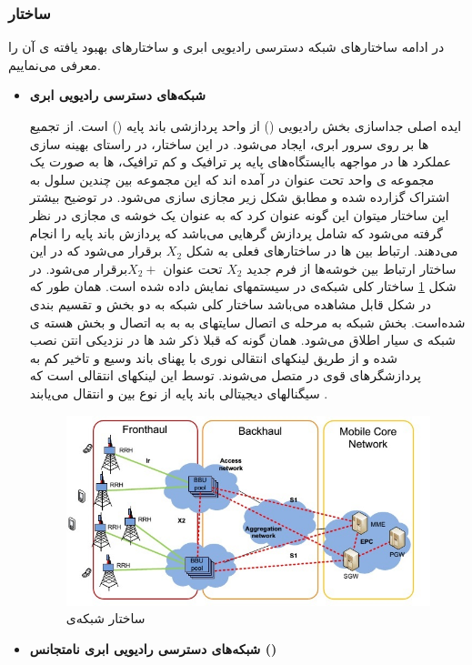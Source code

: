 \subsubsection{ساختار }
در ادامه ساختارهای شبکه دسترسی رادیویی ابری و ساختارهای بهبود یافته ی آن را معرفی می‌نماییم.
\begin{itemize}
\item \textbf{شبکه‌های دسترسی رادیویی ابری}


ایده اصلی  جداسازی بخش رادیویی () 
 از واحد پردازشی باند پایه ()
  است.
از تجمیع ها بر روی سرور ابری،  ایجاد می‌شود.
در این ساختار، در راستای بهینه سازی عملکرد 
ها در مواجهه باایستگاه‌های پایه پر ترافیک و کم ترافیک،
 ها به صورت یک مجموعه ی واحد تحت عنوان 
 در آمده اند که این مجموعه بین چندین سلول 
 به اشتراک گزارده شده و مطابق شکل زیر مجازی سازی
می‌شود. 
در توضیح بیشتر این ساختار میتوان این گونه
عنوان کرد که  به عنوان یک خوشه ی مجازی
در نظر گرفته می‌شود که شامل پردازش گرهایی می‌باشد
که پردازش‌‌ باند پایه را انجام می‌دهند. ارتباط بین
  ها در ساختارهای فعلی به شکل  $X_2$ برقرار می‌شود
که در این ساختار ارتباط بین خوشه‌ها از فرم جدید $X_2$
تحت عنوان  $X_2 +$برقرار می‌شود.
\newline
در شکل \ref{fig:C-RAN} ساختار کلی شبکه‌ی   در سیستمهای
 نمایش داده شده است. همان طور که در شکل قابل
مشاهده می‌باشد ساختار کلی شبکه   به دو بخش
  و  تقسیم بندی شده‌است. بخش
 شبکه به مرحله ی اتصال سایتهای به
 به  به اتصال  و بخش 
هسته ی شبکه ی سیار اطلاق می‌شود. همان گونه که قبلا
ذکر شد ها در نزدیکی انتن نصب شده و از طریق
لینکهای انتقالی نوری با پهنای باند وسیع و تاخیر کم به
پردازشگرهای قوی در  متصل می‌شوند. توسط این
لینکهای انتقالی است که سیگنالهای دیجیتالی باند
پایه از نوع  بین  و  انتقال می‌یابند \cite{checko2015cloud}.
\begin{figure}
  \centering
    \includegraphics[width=\textwidth]{./fig/CRAN}
  \caption{ساختار شبکه‌ی  \cite{checko2015cloud}}
  \label{fig:C-RAN}
\end{figure}
\item \textbf{شبکه‌های دسترسی رادیویی ابری نامتجانس ()}



\end{itemize}
